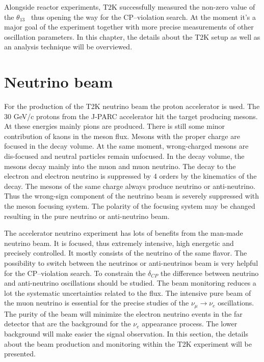 \documentclass[../main.tex]{subfiles}
\begin{document}
Alongside reactor experiments, T2K successfully measured the non-zero value of the $\theta_{13}$~\cite{Abe2014a} thus opening the way for the CP--violation search. At the moment it's a major goal of the experiment together with more precise measurements of other oscillation parameters. In this chapter, the details about the T2K setup as well as an analysis technique will be overviewed.

\section{Neutrino beam}
\label{ch:T2K:nu_beam}

For the production of the T2K neutrino beam the proton accelerator is used. The 30 GeV/c protons from the J-PARC accelerator hit the target producing mesons. At these energies mainly pions are produced. There is still some minor contribution of kaons in the meson flux. Mesons with the proper charge are focused in the decay volume. At the same moment, wrong-charged mesons are dis-focused and neutral particles remain unfocused. In the decay volume, the mesons decay mainly into the muon and muon neutrino. The decay to the electron and electron neutrino is suppressed by 4 orders by the kinematics of the decay. The mesons of the same charge always produce neutrino or anti-neutrino. Thus the wrong-sign component of the neutrino beam is severely suppressed with the meson focusing system. The polarity of the focusing system may be changed resulting in the pure neutrino or anti-neutrino beam.

The accelerator neutrino experiment has lots of benefits from the man-made neutrino beam. It is focused, thus extremely intensive, high energetic and precisely controlled. It mostly consists of the neutrino of the same flavor. The possibility to switch between the neutrinos or anti-neutrinos beam is very helpful for the CP--violation search. To constrain the $\delta_{CP}$ the difference between neutrino and anti-neutrino oscillations should be studied. The beam monitoring reduces a lot the systematic uncertainties related to the flux. The intensive pure beam of the muon neutrino is essential for the precise studies of the $\nu_\mu\to\nu_e$ oscillations. The purity of the beam will minimize the electron neutrino events in the far detector that are the background for the $\nu_e$ appearance process. The lower background will make easier the signal observation. In this section, the details about the beam production and monitoring within the T2K experiment will be presented.
\end{document}
